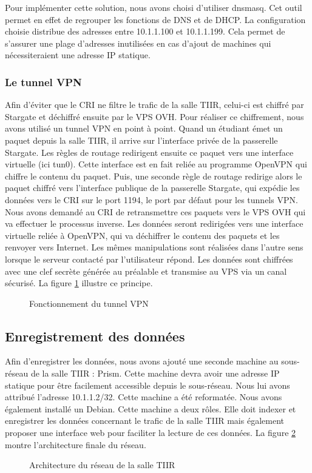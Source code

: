 Pour implémenter cette solution, nous avons choisi d'utiliser dnsmasq. Cet outil permet en effet de regrouper les fonctions de DNS et de DHCP. La configuration choisie distribue des adresses entre 10.1.1.100 et 10.1.1.199. Cela permet de s'assurer une plage d'adresses inutilisées en cas d'ajout de machines qui nécessiteraient une adresse IP statique.

\subsubsection{Le tunnel VPN}

Afin d'éviter que le CRI ne filtre le trafic de la salle TIIR, celui-ci est chiffré par Stargate et déchiffré ensuite par le VPS OVH. Pour réaliser ce chiffrement, nous avons utilisé un tunnel VPN en point à point. Quand un étudiant émet un paquet depuis la salle TIIR, il arrive sur l'interface privée de la passerelle Stargate. Les règles de routage redirigent ensuite ce paquet vers une interface virtuelle (ici tun0). Cette interface est en fait reliée au programme OpenVPN qui chiffre le contenu du paquet. Puis, une seconde règle de routage redirige alors le paquet chiffré vers l'interface publique de la passerelle Stargate, qui expédie les données vers le CRI sur le port 1194, le port par  défaut pour les tunnels VPN. Nous avons demandé au CRI de retransmettre ces paquets vers le VPS OVH qui va effectuer le processus inverse. Les données seront redirigées vers une interface virtuelle reliée à OpenVPN, qui va déchiffrer le contenu des paquets et les renvoyer vers Internet. Les mêmes manipulations sont réalisées dans l'autre sens lorsque le serveur contacté par l'utilisateur répond. Les données sont chiffrées avec une clef secrète générée au préalable et transmise au VPS via un canal sécurisé. La figure \ref{tunnel} illustre ce principe.

\begin{figure}[!h]
\centering
\def\svgwidth{\columnwidth}

\caption{Fonctionnement du tunnel VPN}
\label{tunnel}
\end{figure}

\subsection{Enregistrement des données}

Afin d'enregistrer les données, nous avons ajouté une seconde machine au sous-réseau de la salle TIIR : Prism. Cette machine devra avoir une adresse IP statique pour être facilement accessible depuis le sous-réseau. Nous lui avons attribué l'adresse 10.1.1.2/32. Cette machine a été reformatée. Nous avons également installé un Debian. Cette machine a deux rôles. Elle doit indexer et enregistrer les données concernant le trafic de la salle TIIR mais également proposer une interface web pour faciliter la lecture de ces données. La figure \ref{architecture_finale} montre l'architecture finale du réseau.

\begin{figure}[!h]
\centering
\def\svgwidth{\columnwidth}

\caption{Architecture du réseau de la salle TIIR}
\label{architecture_finale}
\end{figure}


